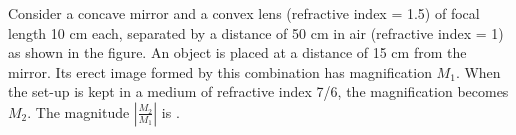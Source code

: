 

    \item Consider a concave mirror and a convex lens (refractive index = 1.5) of focal length 10 cm each, separated by a distance of 50 cm in air (refractive index = 1) as shown in the figure. An object is placed at a distance of 15 cm from the mirror. Its erect image formed by this combination has magnification \(M_1\). When the set-up is kept in a medium of refractive index 7/6, the magnification becomes \(M_2\). The magnitude \(\left|\frac{M_2}{M_1}\right|\) is \underline{\hspace{2.5 cm}}.
    \begin{center}
    \end{center}

